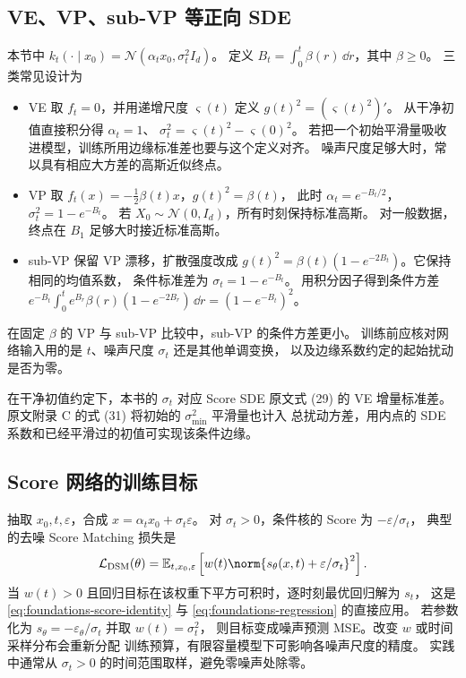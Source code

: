 \subsection{VE、VP、sub-VP 等正向 SDE}

本节中 \(k_t(\cdot\mid x_0)=\mathcal N(\alpha_t x_0,\sigma_t^2I_d)\)。
定义 \(B_t=\int_0^t\beta(r)\,\dd r\)，其中 \(\beta\ge0\)。
三类常见设计为
\begin{itemize}
  \item VE 取 \(f_t=0\)，并用递增尺度 \(\varsigma(t)\) 定义
    \(g(t)^2=(\varsigma(t)^2)'\)。
    从干净初值直接积分得 \(\alpha_t=1\)、
    \(\sigma_t^2=\varsigma(t)^2-\varsigma(0)^2\)。
    若把一个初始平滑量吸收进模型，训练所用边缘标准差也要与这个定义对齐。
    噪声尺度足够大时，常以具有相应大方差的高斯近似终点。
  \item VP 取 \(f_t(x)=-\tfrac12\beta(t)x\)，\(g(t)^2=\beta(t)\)，
    此时 \(\alpha_t=e^{-B_t/2}\)，\(\sigma_t^2=1-e^{-B_t}\)。
    若 \(X_0\sim\mathcal N(0,I_d)\)，所有时刻保持标准高斯。
    对一般数据，终点在 \(B_1\) 足够大时接近标准高斯。
  \item sub-VP 保留 VP 漂移，扩散强度改成
    \(g(t)^2=\beta(t)(1-e^{-2B_t})\)。它保持相同的均值系数，
    条件标准差为 \(\sigma_t=1-e^{-B_t}\)。
    用积分因子得到条件方差
    \(e^{-B_t}\int_0^t e^{B_r}\beta(r)(1-e^{-2B_r})\,\dd r
      =(1-e^{-B_t})^2\)。
\end{itemize}
在固定 \(\beta\) 的 VP 与 sub-VP 比较中，sub-VP 的条件方差更小。
训练前应核对网络输入用的是 \(t\)、噪声尺度 \(\sigma_t\) 还是其他单调变换，
以及边缘系数约定的起始扰动是否为零。

在干净初值约定下，本书的 \(\sigma_t\) 对应 Score SDE 原文式 (29) 的
VE 增量标准差。原文附录 C 的式 (31) 将初始的 \(\sigma_{\min}^2\) 平滑量也计入
总扰动方差，用内点的 SDE 系数和已经平滑过的初值可实现该条件边缘。

\subsection{Score 网络的训练目标}

抽取 \(x_0,t,\varepsilon\)，合成 \(x=\alpha_tx_0+\sigma_t\varepsilon\)。
对 \(\sigma_t>0\)，条件核的 Score 为 \(-\varepsilon/\sigma_t\)，
典型的去噪 Score Matching 损失是
\begin{equation}
  \mathcal L_{\mathrm{DSM}}(\theta)
  =\mathbb E_{t,x_0,\varepsilon}
   \left[w(t)\norm{s_\theta(x,t)+\varepsilon/\sigma_t}^2\right] .
  \label{eq:overview-score-loss}
\end{equation}
当 \(w(t)>0\) 且回归目标在该权重下平方可积时，逐时刻最优回归解为 \(s_t\)，
这是 \eqref{eq:foundations-score-identity} 与
\eqref{eq:foundations-regression} 的直接应用。
若参数化为 \(s_\theta=-\varepsilon_\theta/\sigma_t\) 并取 \(w(t)=\sigma_t^2\)，
则目标变成噪声预测 MSE。改变 \(w\) 或时间采样分布会重新分配
训练预算，有限容量模型下可影响各噪声尺度的精度。
实践中通常从 \(\sigma_t>0\) 的时间范围取样，避免零噪声处除零。

